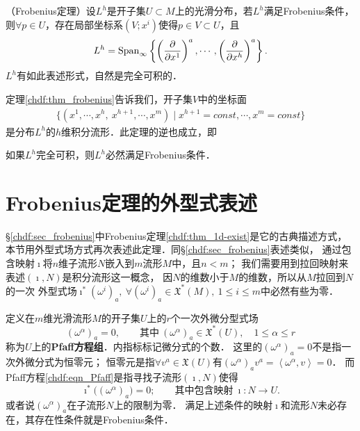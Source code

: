 
\begin{theorem}\label{chdf:thm_frobenius}
    （Frobenius定理）设$L^h$是开子集$U\subset M$上的光滑分布，若$L^h$满足Frobenius条件，
    则$\forall p\in U$，存在局部坐标系$(V;x^i)$使得$p\in V\subset U$，且
    \begin{equation}\label{chdf:eqn_frobenius-h}
        L^h={\rm Span}_{\infty}\left\{\left(\frac{\partial }{\partial x^1} \right)^a,
        \cdots,\left(\frac{\partial }{\partial x^h} \right)^a \right\}.
    \end{equation}
    $L^h$有如此表述形式，自然是完全可积的．
\end{theorem}

定理\ref{chdf:thm_frobenius}告诉我们，开子集$V$中的坐标面
\begin{align*}
	\{(x^1,\cdots,x^h,\  x^{h+1},\cdots, x^m) \mid x^{h+1}=const, \cdots, x^{m}=const\}
\end{align*}
是分布$L^h$的$h$维积分流形．此定理的逆也成立，即

\begin{theorem}\label{chdf:thm_frobenius-converse}
    如果$L^h$完全可积，则$L^h$必然满足Frobenius条件．
\end{theorem}

\section{Frobenius定理的外型式表述}\label{chdf:sec_frobenius-ed}

\S\ref{chdf:sec_frobenius}中Frobenius定理\ref{chdf:thm_1d-exist}是它的古典描述方式，
本节用外型式场方式再次表述此定理．同\S\ref{chdf:sec_frobenius}表述类似，
通过包含映射$\imath$将$n$维子流形$N$嵌入到$m$流形$M$中，且$n < m$；
我们需要用到拉回映射来表述$(\imath,N)$是积分流形这一概念，
因$N$的维数小于$M$的维数，所以从$M$拉回到$N$的一次
外型式场$\imath^*(\omega^i)_a,\  \forall(\omega^i)_a\in\mathfrak{X}^*(M),
\ 1\leqslant i \leqslant m$中必然有些为零．


定义在$m$维光滑流形$M$的开子集$U$上的$r$个一次外微分型式场
\begin{equation}\label{chdf:eqn_Pfaff}
    (\omega^\alpha)_a = 0, \qquad {\text{其中}}\ (\omega^\alpha)_a
    \in\mathfrak{X}^*(U), \quad 1\leqslant \alpha \leqslant r
\end{equation}
称为$U$上的{\bfseries \heiti Pfaff方程组}．内指标标记微分式的个数．
这里的$(\omega^\alpha)_a = 0$不是指一次外微分式为恒零元；
恒零元是指$\forall v^a\in \mathfrak{X}(U)$有$(\omega^\alpha)_a v^a =\left<\omega^\alpha, v\right>=0$．
而Pfaff方程\eqref{chdf:eqn_Pfaff}是指寻找子流形$(\imath,N)$使得
\begin{equation}\label{chdf:eqn_solution-ed}
    \imath^* \bigl((\omega^\alpha)_a \bigr) = 0; \qquad \text{其中包含映射}\ \imath:N\to U .
\end{equation}
或者说$(\omega^\alpha)_a$在子流形$N$上的限制为零．
满足上述条件的映射$\imath$和流形$N$未必存在，其存在性条件就是Frobenius条件．


